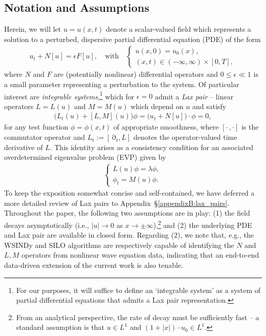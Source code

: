 \documentclass[journal=gmj]{CUP-JNL-DTM}%
\DeclareMathOperator{\pt}{\partial}
\theoremstyle{definition}
\numberwithin{equation}{section}
\begin{document}
\subsection{Notation and Assumptions}\label{subsec:notation_and_assumptions}
Herein, we will let $u = u(x,t)$ denote a scalar-valued field which represents a solution to a perturbed, dispersive partial differential equation (PDE) of the form \begin{align}\label{eq:dispersive_PDE}
    u_t + N[u] = \epsilon F[u],
    \quad \text{with} \quad
    \begin{cases}
        u(x,0) = u_0(x),
        \\
        (x,t) \in (-\infty, \infty) \times [0,T],
    \end{cases}
\end{align} where $N$ and $F$ are (potentially nonlinear) differential operators and $0 \leq \epsilon \ll 1$ is a small parameter representing a perturbation to the system. Of particular interest are \textit{integrable systems},\footnote{For our purposes, it will suffice to define an `integrable system' as a system of partial differential equations that admits a Lax pair representation.} which for $\epsilon = 0$ admit a \textit{Lax pair} -- linear operators $L=L(u)$ and $M=M(u)$ which depend on $u$ and satisfy \begin{align}\label{eq:lax_eqn}
    \big(L_t(u) + [L, M](u)\big)\phi = \big(u_t + N[u]\big) \cdot \phi = 0,
\end{align} for any test function $\phi = \phi(x,t)$ of appropriate smoothness, where $[\cdot\,,\cdot]$ is the commutator operator and $L_t := [\pt_t, L]$ denotes the operator-valued time derivative of $L$. This identity arises as a consistency condition for an associated overdetermined eigenvalue problem (EVP) given by \begin{align}\label{eq:lax_evp}
    \begin{cases}
        L(u)\phi = \lambda\phi,
        \\
        \phi_t = M(u)\phi.
    \end{cases}
\end{align} To keep the exposition somewhat concise and self-contained, we have deferred a more detailed review of Lax pairs to Appendix~\S\ref{appendixB:lax_pairs}. Throughout the paper, the following two assumptions are in play: (1) the field decays asymptotically (i.e., $|u| \rightarrow 0$ as $x \rightarrow \pm\infty$),\footnote{From an analytical perspective, the rate of decay must be sufficiently fast -- a standard assumption is that $u \in L^1$ and $(1+|x|) \cdot u_0 \in L^1$.} and (2) the underlying PDE and Lax pair are available in closed form. Regarding (2), we note that, e.g., the WSINDy \cite{Messenger.etal2024SciRep} and SILO \cite{Adriazola.etal2026SIAMJApplDynSyst} algorithms are respectively capable of identifying the $N$ and $L,M$ operators from nonlinear wave equation data, indicating that an end-to-end data-driven extension of the current work is also tenable.
\end{document}
